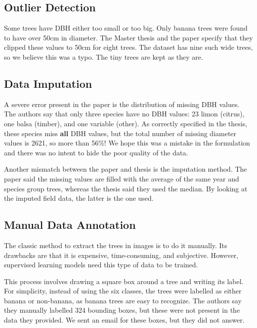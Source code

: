 \documentclass[10pt,twocolumn,letterpaper]{article}
\begin{document}
\subsection{Outlier Detection}
Some trees have DBH either too small or too big. Only banana trees were found to have over 50cm in diameter. The Master thesis and the paper specify that they clipped these values to 50cm for eight trees. The dataset has nine such wide trees, so we believe this was a typo. The tiny trees are kept as they are.

\subsection{Data Imputation}\label{data-imput-subsec}
A severe error present in the paper is the distribution of missing DBH values. The authors say that only three species have no DBH values: 23 limon (citrus), one balsa (timber), and one variable (other). As correctly specified in the thesis, these species miss \textbf{all} DBH values, but the total number of missing diameter values is 2621, so more than 56\%! We hope this was a mistake in the formulation and there was no intent to hide the poor quality of the data.

Another mismatch between the paper and thesis is the imputation method. The paper said the missing values are filled with the average of the same year and species group trees, whereas the thesis said they used the median. By looking at the imputed field data, the latter is the one used.

\subsection{Manual Data Annotation}
The classic method to extract the trees in images is to do it manually. Its drawbacks are that it is expensive, time-consuming, and subjective. However, supervised learning models need this type of data to be trained.

This process involves drawing a square box around a tree and writing its label. For simplicity, instead of using the six classes, the trees were labelled as either banana or non-banana, as banana trees are easy to recognize. The authors say they manually labelled 324 bounding boxes, but these were not present in the data they provided. We sent an email for these boxes, but they did not answer.
\end{document}

